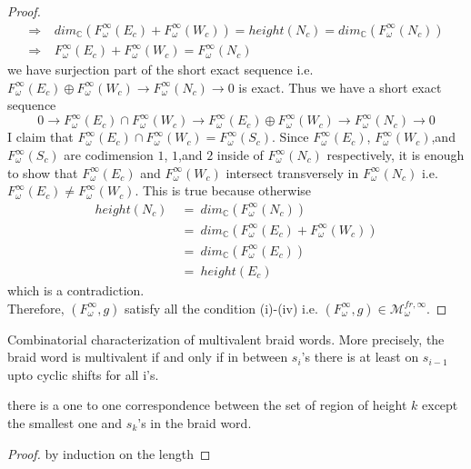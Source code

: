 \begin{proof}
\begin{align*}
\Rightarrow~& dim_\mathbb{C}(F_\omega^\infty(E_c) + F_\omega^\infty(W_c))=height(N_c)=dim_\mathbb{C}(F_\omega^\infty(N_c))\\
\Rightarrow~& F_\omega^\infty(E_c) + F_\omega^\infty(W_c) = F_\omega^\infty(N_c)
\end{align*}
we have surjection part of the short exact sequence i.e. $F_\omega^\infty(E_c)\oplus F_\omega^\infty(W_c)\rightarrow F_\omega^\infty(N_c)\rightarrow 0$ is exact. Thus we have a short exact sequence
\[
0\rightarrow F_\omega^\infty(E_c)\cap F_\omega^\infty(W_c) \rightarrow F_\omega^\infty(E_c)\oplus F_\omega^\infty(W_c)\rightarrow F_\omega^\infty(N_c)\rightarrow 0
\] 
I claim that $F_\omega^\infty(E_c)\cap F_\omega^\infty(W_c) = F_\omega^\infty (S_c)$. Since $F_\omega^\infty(E_c)$, $F_\omega^\infty(W_c)$,and $F_\omega^\infty(S_c)$ are codimension $1$, $1$,and $2$ inside of $F_\omega^\infty(N_c)$ respectively, it is enough to show that $F_\omega^\infty(E_c)$ and $F_\omega^\infty(W_c)$ intersect transversely in $F_\omega^\infty(N_c)$ i.e. $F_\omega^\infty(E_c) \neq F_\omega^\infty(W_c)$. This is true because otherwise
\begin{align*}
height(N_c)~&=~dim_\mathbb{C}(F_\omega^\infty(N_c))\\
&=~dim_\mathbb{C}(F_\omega^\infty(E_c)+F_\omega^\infty(W_c))\\
&=~dim_\mathbb{C}(F_\omega^\infty(E_c))\\
&=~height(E_c) 
\end{align*}
which is a contradiction.\\
Therefore, $(F_\omega^\infty, g)$ satisfy all the condition (\Rn{1})-(\Rn{4}) i.e. $(F_\omega^\infty, g)\in \mathcal{M}_\omega^{fr,\infty}$.
\end{proof}


\begin{theorem}
	Combinatorial characterization of multivalent braid words. More precisely, the braid word is multivalent if and only if in between $s_i$'s there is at least on $s_{i-1}$ upto cyclic shifts for all i's.
\end{theorem}

\begin{lemma}
there is a one to one correspondence between the set of region of height $k$ except the smallest one and $s_k$'s in the braid word.  
\end{lemma}
\begin{proof}
 by induction on the length
\end{proof}

